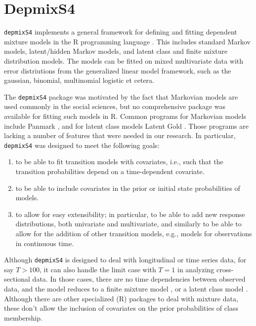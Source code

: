 \documentclass[a4paper,12pt,man]{apa} %
\newcommand{\citep}{\cite}
\newcommand{\pkg}{\texttt}
\begin{document}
\section{DepmixS4}

\pkg{depmixS4} \citep{Visser2008a} implements a general framework for
defining and fitting dependent mixture models in the R programming
language \citep{R2008}.  This includes standard Markov models,
latent/hidden Markov models, and latent class and finite mixture
distribution models.  The models can be fitted on mixed multivariate
data with error distriutions from the generalized linear model
framework, such as the gaussian, binomial, multinomial logistic et
cetera.

The \pkg{depmixS4} package was motivated by the fact that Markovian
models are used commonly in the social sciences, but no comprehensive
package was available for fitting such models in R. Common programs
for Markovian models include Panmark \citep{Pol1996}, and for latent
class models Latent Gold \citep{Vermunt2003}.  Those programs are
lacking a number of features that were needed in our research.  In
particular, \pkg{depmixS4} was designed to meet the following goals:
\begin{enumerate}

	\item to be able to fit transition models with covariates, i.e.,
	such that the transition probabilities depend on a time-dependent 
	covariate.

	\item to be able to include covariates in the prior or initial
	state probabilities of models.

	\item to allow for easy extensibility; in particular, to be able
	to add new response distributions, both univariate and
	multivariate, and similarly to be able to allow for the addition
	of other transition models, e.g., models for observations in 
	continuous time. 

\end{enumerate}

Although \pkg{depmixS4} is designed to deal with longitudinal or time
series data, for say $T>100$, it can also handle the limit case with
$T=1$ in analyzing cross-sectional data.  In those cases, there are no
time dependencies between observed data, and the model reduces to a
finite mixture model \cite{McLachlan2000}, or a latent class model
\cite{McCutcheon1987}.  Although there are other specialized (R)
packages to deal with mixture data, these don't allow the inclusion of 
covariates on the prior probabilities of class membership.
\end{document}
